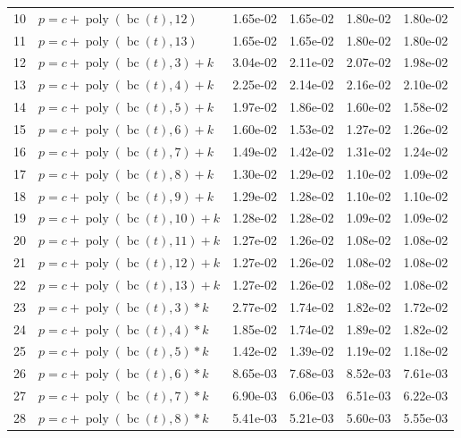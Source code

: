 \documentclass[12pt,a4paper]{article}
\DeclareMathOperator{\bc}{bc}
\DeclareMathOperator{\poly}{poly}
\begin{document}
\begin{longtable}[t]{ll>{\raggedleft\arraybackslash}p{2cm}>{\raggedleft\arraybackslash}p{2cm}>{\raggedleft\arraybackslash}p{2cm}>{\raggedleft\arraybackslash}p{2cm}}
10 & $p = c + \poly\left( \bc(t), 12 \right)$ & 1.65e-02 & 1.65e-02 & 1.80e-02 & 1.80e-02\\
\rowcolor{gray!6}  11 & $p = c + \poly\left( \bc(t), 13 \right)$ & 1.65e-02 & 1.65e-02 & 1.80e-02 & 1.80e-02\\
12 & $p = c + \poly\left( \bc(t), 3 \right) + k$ & 3.04e-02 & 2.11e-02 & 2.07e-02 & 1.98e-02\\
\rowcolor{gray!6}  13 & $p = c + \poly\left( \bc(t), 4 \right) + k$ & 2.25e-02 & 2.14e-02 & 2.16e-02 & 2.10e-02\\
14 & $p = c + \poly\left( \bc(t), 5 \right) + k$ & 1.97e-02 & 1.86e-02 & 1.60e-02 & 1.58e-02\\
\rowcolor{gray!6}  15 & $p = c + \poly\left( \bc(t), 6 \right) + k$ & 1.60e-02 & 1.53e-02 & 1.27e-02 & 1.26e-02\\
16 & $p = c + \poly\left( \bc(t), 7 \right) + k$ & 1.49e-02 & 1.42e-02 & 1.31e-02 & 1.24e-02\\
\rowcolor{gray!6}  17 & $p = c + \poly\left( \bc(t), 8 \right) + k$ & 1.30e-02 & 1.29e-02 & 1.10e-02 & 1.09e-02\\
18 & $p = c + \poly\left( \bc(t), 9 \right) + k$ & 1.29e-02 & 1.28e-02 & 1.10e-02 & 1.10e-02\\
\rowcolor{gray!6}  19 & $p = c + \poly\left( \bc(t), 10 \right) + k$ & 1.28e-02 & 1.28e-02 & 1.09e-02 & 1.09e-02\\
20 & $p = c + \poly\left( \bc(t), 11 \right) + k$ & 1.27e-02 & 1.26e-02 & 1.08e-02 & 1.08e-02\\
\rowcolor{gray!6}  21 & $p = c + \poly\left( \bc(t), 12 \right) + k$ & 1.27e-02 & 1.26e-02 & 1.08e-02 & 1.08e-02\\
22 & $p = c + \poly\left( \bc(t), 13 \right) + k$ & 1.27e-02 & 1.26e-02 & 1.08e-02 & 1.08e-02\\
\rowcolor{gray!6}  23 & $p = c + \poly\left( \bc(t), 3 \right) * k$ & 2.77e-02 & 1.74e-02 & 1.82e-02 & 1.72e-02\\
24 & $p = c + \poly\left( \bc(t), 4 \right) * k$ & 1.85e-02 & 1.74e-02 & 1.89e-02 & 1.82e-02\\
\rowcolor{gray!6}  25 & $p = c + \poly\left( \bc(t), 5 \right) * k$ & 1.42e-02 & 1.39e-02 & 1.19e-02 & 1.18e-02\\
26 & $p = c + \poly\left( \bc(t), 6 \right) * k$ & 8.65e-03 & 7.68e-03 & 8.52e-03 & 7.61e-03\\
\rowcolor{gray!6}  27 & $p = c + \poly\left( \bc(t), 7 \right) * k$ & 6.90e-03 & 6.06e-03 & 6.51e-03 & 6.22e-03\\
28 & $p = c + \poly\left( \bc(t), 8 \right) * k$ & 5.41e-03 & 5.21e-03 & 5.60e-03 & 5.55e-03\\

\end{longtable}
\end{document}
